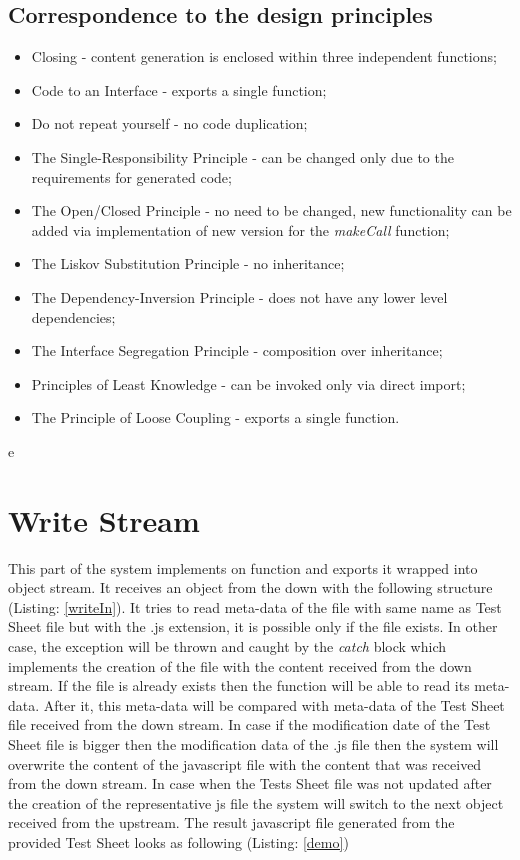 {\subsection{Correspondence to the design principles}
\begin{itemize}
	\item Closing - content generation is enclosed within three independent functions;
	\item Code to an Interface - exports a single function;
	\item Do not repeat yourself - no code duplication;
	\item The Single-Responsibility Principle - can be changed only due to the requirements for generated code;
	\item The Open/Closed Principle - no need to be changed, new functionality can be added via implementation of new version for the \textit{makeCall} function;
	\item The Liskov Substitution Principle - no inheritance;
	\item The Dependency-Inversion Principle - does not have any lower level dependencies;
	\item The Interface Segregation Principle - composition over inheritance;
	\item Principles of Least Knowledge - can be invoked only via direct import;
	\item The Principle of Loose Coupling - exports a single function.
\end{itemize}

e\section{Write Stream}
\label{sec:write}
This part of the system implements on function and exports it wrapped into object stream. It receives an object from the down with the following structure (Listing: \ref{writeIn}). It tries to read meta-data of the file with same name as Test Sheet file but with the .js extension, it is possible only if the file exists. In other case, the exception will be thrown and caught by the \textit{ catch} block which implements the creation of the file with the content received from the down stream. If the file is already exists then the function will be able to read its meta-data. After it, this meta-data will be compared with meta-data of the Test Sheet file received from the down stream. In case if the modification date of the Test Sheet file is bigger then the modification data of the  .js file then the system will overwrite the content of the javascript file with the content that was received from the down stream. In case when the Tests Sheet file was not updated after the creation of the representative js file the system will switch to the next object received from the upstream. The result javascript file generated from the provided Test Sheet looks as following (Listing: \ref{demo})

}

